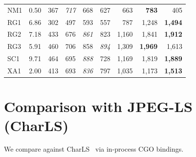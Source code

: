 \documentclass[10pt,twocolumn]{article}
\begin{document}
\begin{table}[t]
\begin{tabular}{lrrrrrrrr}
    NM1 & 0.50 & 367 & \textit{717} & 668 & 627 & 663 & \textbf{783} & 405 \\
    RG1 & 6.86 & 302 & 497 & 593 & 557 & 787 & 1,248 & \textbf{1,494} \\
    RG2 & 7.18 & 433 & 676 & \textit{861} & 823 & 1,160 & 1,841 & \textbf{1,912} \\
    RG3 & 5.91 & 460 & 706 & 858 & \textit{894} & 1,309 & \textbf{1,969} & 1,613 \\
    SC1 & 9.71 & 464 & 695 & \textit{888} & 728 & 1,169 & 1,819 & \textbf{1,889} \\
    XA1 & 2.00 & 413 & 693 & \textit{836} & 797 & 1,035 & 1,173 & \textbf{1,513} \\
    \bottomrule
  \end{tabular}
\end{table}

\section{Comparison with JPEG-LS (CharLS)}
\label{sec:jpegls}

We compare against CharLS~\cite{charls} via in-process CGO bindings.
\end{document}
